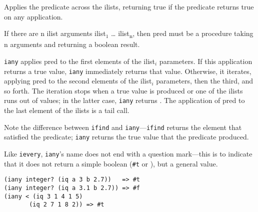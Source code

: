 \begin{entry}{%
  }

  Applies the predicate across the ilists, returning true if
  the predicate returns true on any application.

  If there are n ilist arguments ilist$_1$ \ldots{}
  ilist\textsubscript{n}, then pred must be a procedure taking n
  arguments and returning a boolean result.

  \texttt{iany} applies pred to the first elements of the ilist$_i$
  parameters. If this application returns a true value, \texttt{iany}
  immediately returns that value. Otherwise, it iterates, applying
  pred to the second elements of the ilist$_i$ parameters, then the
  third, and so forth. The iteration stops when a true value is
  produced or one of the ilists runs out of values; in the latter
  case, \texttt{iany} returns \schfalse{}.  The application of pred
  to the last element of the ilists is a tail call.

  Note the difference between \texttt{ifind} and
  \texttt{iany}---\texttt{ifind} returns the element that satisfied
  the predicate; 
  \texttt{iany} returns the true value that the predicate produced.

  Like \texttt{ievery}, \texttt{iany}'s name does not end with a
  question mark---this is to indicate that it does not return a
  simple boolean (\texttt{\#t} or \schfalse{}), but a general value.

\begin{verbatim}
(iany integer? (iq a 3 b 2.7))   => #t
(iany integer? (iq a 3.1 b 2.7)) => #f
(iany < (iq 3 1 4 1 5)
       (iq 2 7 1 8 2)) => #t
\end{verbatim}
\end{entry}


